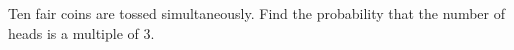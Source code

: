 Ten fair coins are tossed simultaneously. Find the probability that the number of heads is a multiple of $3$.
